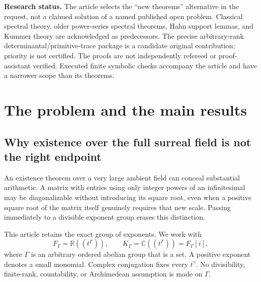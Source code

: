 \documentclass[11pt,letterpaper]{article}
\numberwithin{equation}{section}
\theoremstyle{definition}
\theoremstyle{remark}
\newcommand{\R}{\mathbb R}
\newcommand{\C}{\mathbb C}
\newcommand{\KG}{K_{\Gamma}}
\newcommand{\FG}{F_{\Gamma}}
\begin{document}
\begin{titlepage}
\begin{minipage}{0.94\textwidth}
\begin{abstract}
For surcomplex matrices, the results descend to the subgroup generated by the
actual input supports. Thus eigenvectors need no new fractional scales, while
positive matrix roots have an exactly measurable, and sometimes maximal,
ramification cost.
\end{abstract}
\end{minipage}
\vfill
\begin{minipage}{0.94\textwidth}\small
\textbf{Research status.} The article selects the ``new theorems'' alternative
in the request, not a claimed solution of a named published open problem.
Classical spectral theory, older power-series spectral theorems, Hahn support
lemmas, and Kummer theory are acknowledged as predecessors. The precise
arbitrary-rank determinantal/primitive-trace package is a candidate original
contribution; priority is not certified. The proofs are not independently
refereed or proof-assistant verified. Executed finite symbolic checks accompany
the article and have a narrower scope than its theorems.
\end{minipage}
\end{titlepage}
\hypersetup{pageanchor=true}
\begingroup\small\setlength{\parskip}{0pt}\tableofcontents\endgroup
\clearpage{}

\section{The problem and the main results}
\label{sec:intro}

\subsection{Why existence over the full surreal field is not the right endpoint}

An existence theorem over a very large ambient field can conceal substantial
arithmetic. A matrix with entries using only integer powers of an infinitesimal
may be diagonalizable without introducing its square root, even when a
positive square root of the matrix itself genuinely requires that new scale.
Passing immediately to a divisible exponent group erases this distinction.

This article retains the exact group of exponents. We work with
\begin{equation}\label{eq:fields}
 \FG=\R((t^\Gamma)),\qquad \KG=\C((t^\Gamma))=\FG[i],
\end{equation}
where $\Gamma$ is an arbitrary ordered abelian group that is a set. A positive
exponent denotes a small monomial. Complex conjugation fixes every $t^\gamma$.
No divisibility, finite-rank, countability, or Archimedean assumption is made
on $\Gamma$.
\end{document}
